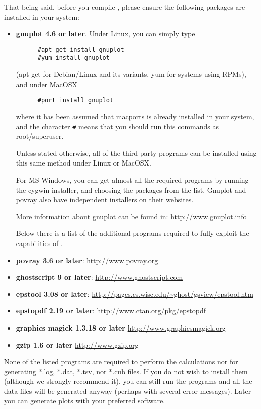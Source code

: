 That being said, before you compile \DTK{}, please ensure the following packages are installed in your system:
\begin{itemize}
   \item \textbf{gnuplot 4.6 or later}. Under Linux, you can simply type
   \begin{verbatim}
      #apt-get install gnuplot
      #yum install gnuplot
   \end{verbatim}
   (apt-get for Debian/Linux and its variants, yum for systems using RPMs), and under MacOSX
   \begin{verbatim}
      #port install gnuplot
   \end{verbatim}
   where it has been assumed that macports is already installed in your system, and the character \texttt{\#} means that you should run this commands as root/superuser.
   
   Unless stated otherwise, all of the third-party programs can be installed using this same method under Linux or MacOSX.
   
   For MS Windows, you can get almost all the required programs by running the cygwin installer, and choosing the packages from the list. Gnuplot and povray also have independent installers on their websites.
   
   More information about gnuplot can be found in: \url{http://www.gnuplot.info}
   
   Below there is a list of the additional programs required to fully exploit the capabilities of \DTK.
   
   \item \textbf{povray 3.6 or later}: \url{http://www.povray.org}
   \item \textbf{ghostscript 9 or later}: \url{http://www.ghostscript.com}
   \item \textbf{epstool 3.08 or later}: \url{http://pages.cs.wisc.edu/~ghost/gsview/epstool.htm}
   \item \textbf{epstopdf 2.19 or later}: \url{http://www.ctan.org/pkg/epstopdf}
   \item \textbf{graphics magick 1.3.18 or later} \url{http://www.graphicsmagick.org}
   \item \textbf{gzip 1.6 or later} \url{http://www.gzip.org}
\end{itemize}

None of the listed programs are required to perform the calculations nor for generating *.log, *.dat, *.tsv, nor *.cub files. If you do not wish to install them (although we strongly recommend it), you can still run the programs and all the data files will be generated anyway (perhaps with several error messages). Later you can generate plots with your preferred software.


